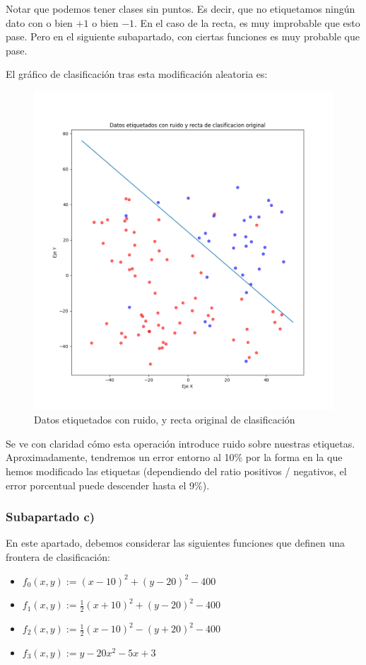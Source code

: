 \documentclass[11pt]{article}
\begin{document}
Notar que podemos tener clases sin puntos. Es decir, que no etiquetamos ningún dato con o bien $+1$ o bien $-1$. En el caso de la recta, es muy improbable que esto pase. Pero en el siguiente subapartado, con ciertas funciones es muy probable que pase.

El gráfico de clasificación tras esta modificación aleatoria es:

\begin{figure}[H]
    \centering
    \includegraphics[width = 0.8 \textwidth]{puntos_clasificados_recta_aleatorizados01}
    \caption{Datos etiquetados con ruido, y recta original de clasificación}
\end{figure}

Se ve con claridad cómo esta operación introduce ruido sobre nuestras etiquetas. Aproximadamente, tendremos un error entorno al 10\% por la forma en la que hemos modificado las etiquetas (dependiendo del ratio positivos / negativos, el error porcentual puede descender hasta el 9\%).

\subsubsection{Subapartado c)} \label{section:apartado_obligatorio}

En este apartado, debemos considerar las siguientes funciones que definen una frontera de clasificación:

\begin{itemize}
    \item $f_0(x, y):= (x - 10)^2 + (y - 20)^2 - 400$
    \item $f_1(x, y):= \frac{1}{2} (x + 10)^2 + (y - 20)^2 - 400$
    \item $f_2(x, y):= \frac{1}{2} (x - 10)^2 - (y + 20)^2 - 400$
    \item $f_3(x, y):= y - 20x^2 -5x +3$
\end{itemize}
\end{document}
